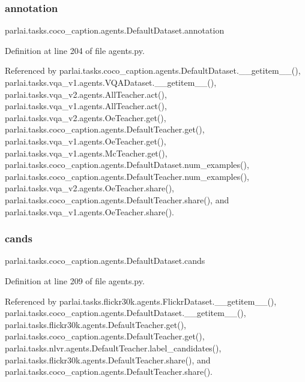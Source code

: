 \subsubsection{\texorpdfstring{annotation}{annotation}}
{\footnotesize\ttfamily parlai.\+tasks.\+coco\+\_\+caption.\+agents.\+Default\+Dataset.\+annotation}



Definition at line 204 of file agents.\+py.



Referenced by parlai.\+tasks.\+coco\+\_\+caption.\+agents.\+Default\+Dataset.\+\_\+\+\_\+getitem\+\_\+\+\_\+(), parlai.\+tasks.\+vqa\+\_\+v1.\+agents.\+V\+Q\+A\+Dataset.\+\_\+\+\_\+getitem\+\_\+\+\_\+(), parlai.\+tasks.\+vqa\+\_\+v2.\+agents.\+All\+Teacher.\+act(), parlai.\+tasks.\+vqa\+\_\+v1.\+agents.\+All\+Teacher.\+act(), parlai.\+tasks.\+vqa\+\_\+v2.\+agents.\+Oe\+Teacher.\+get(), parlai.\+tasks.\+coco\+\_\+caption.\+agents.\+Default\+Teacher.\+get(), parlai.\+tasks.\+vqa\+\_\+v1.\+agents.\+Oe\+Teacher.\+get(), parlai.\+tasks.\+vqa\+\_\+v1.\+agents.\+Mc\+Teacher.\+get(), parlai.\+tasks.\+coco\+\_\+caption.\+agents.\+Default\+Dataset.\+num\+\_\+examples(), parlai.\+tasks.\+coco\+\_\+caption.\+agents.\+Default\+Teacher.\+num\+\_\+examples(), parlai.\+tasks.\+vqa\+\_\+v2.\+agents.\+Oe\+Teacher.\+share(), parlai.\+tasks.\+coco\+\_\+caption.\+agents.\+Default\+Teacher.\+share(), and parlai.\+tasks.\+vqa\+\_\+v1.\+agents.\+Oe\+Teacher.\+share().

\mbox{\label{classparlai_1_1tasks_1_1coco__caption_1_1agents_1_1DefaultDataset_a229275685a80b202055a91072dd982f2}} 
\subsubsection{\texorpdfstring{cands}{cands}}
{\footnotesize\ttfamily parlai.\+tasks.\+coco\+\_\+caption.\+agents.\+Default\+Dataset.\+cands}



Definition at line 209 of file agents.\+py.



Referenced by parlai.\+tasks.\+flickr30k.\+agents.\+Flickr\+Dataset.\+\_\+\+\_\+getitem\+\_\+\+\_\+(), parlai.\+tasks.\+coco\+\_\+caption.\+agents.\+Default\+Dataset.\+\_\+\+\_\+getitem\+\_\+\+\_\+(), parlai.\+tasks.\+flickr30k.\+agents.\+Default\+Teacher.\+get(), parlai.\+tasks.\+coco\+\_\+caption.\+agents.\+Default\+Teacher.\+get(), parlai.\+tasks.\+nlvr.\+agents.\+Default\+Teacher.\+label\+\_\+candidates(), parlai.\+tasks.\+flickr30k.\+agents.\+Default\+Teacher.\+share(), and parlai.\+tasks.\+coco\+\_\+caption.\+agents.\+Default\+Teacher.\+share().

